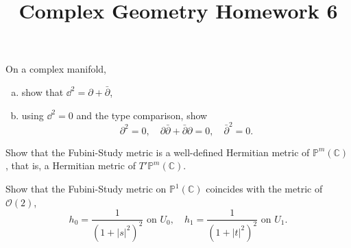 \documentclass[12pt]{article}
\title{Complex Geometry Homework 6}
\author{}
\date{}
\begin{document}
\maketitle
\begin{problem}
  On a complex manifold,
  \begin{enumerate}[(a)]
  \item show that \(\dd^2=\partial +\bar{\partial}\),
  \item using \(\dd^2=0\) and the type comparison, show \[
    \partial^2=0,\quad \partial\bar{\partial}+\bar{\partial}\partial=0,
    \quad \bar{\partial}^2=0
  .\] 
  \end{enumerate}
\end{problem}
\begin{problem}
  Show that the Fubini-Study metric is a well-defined Hermitian metric of
  \(\mathbb{P}^m(\mathbb{C})\), that is, a Hermitian metric of
  \(T'\mathbb{P}^m(\mathbb{C})\). 
\end{problem}
\begin{problem}
  Show that the Fubini-Study metric on \(\mathbb{P}^1(\mathbb{C})\) coincides
  with the metric of \(\mathcal{O}(2)\), \ie\ \[
    h_0=\frac{1}{(1+|s|^2)^2}\text{ on }U_0,\quad
    h_1=\frac{1}{(1+|t|^2)^2}\text{ on }U_1
  .\] 
\end{problem}
\end{document}

